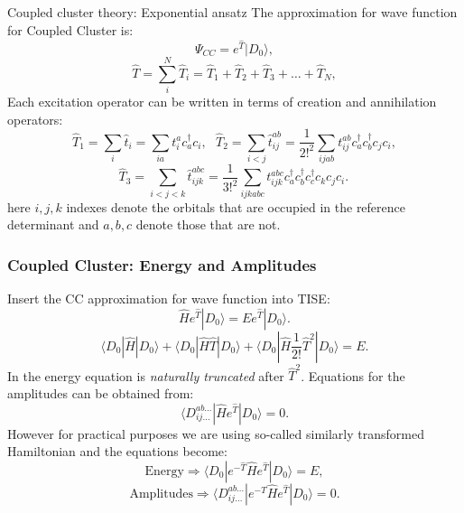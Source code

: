 \documentclass{beamer}
\begin{document}
  \begin{frame}{Coupled cluster theory: Exponential ansatz}
	The approximation for wave function for Coupled Cluster is:
	\begin{equation*}
	\Psi_{CC} =  e^{\hat{T}}|D_0\rangle,
	\end{equation*}
	\begin{equation*}
	\hat{T} = \sum_i^{N} \hat{T}_i  = \hat{T}_1 + \hat{T}_2 +\hat{T}_3 + \dots + \hat{T}_N,
	\end{equation*}
	Each excitation operator can be written in terms of creation and annihilation operators:
	\[ 
	\hat{T}_1 = \sum_{i}\hat{t}_i = \sum_{ia}t_{i}^{a} c^\dag_{a}  c_{i}, \text{    } 
	\hat{T}_2 = \sum_{i<j}\hat{t}_{ij}^{ab} = \frac{1}{2!^2}\sum_{ijab}t_{ij}^{ab} c^\dag_{a} c^\dag_{b} c_{j} c_{i}, 
	\]
	\[ 
	\hat{T}_3 = \sum_{i<j<k}\hat{t}_{ijk}^{abc} = \frac{1}{3!^2}\sum_{ijkabc}t_{ijk}^{abc} c^\dag_{a} c^\dag_{b} c^\dag_{c} c_{k}c_{j} c_{i}.
	\,
	\]
	here $i,j,k$ indexes denote the orbitals that are occupied in the reference determinant and $a,b,c$ denote those that are not.
	
\end{frame}




\begin{frame}
\frametitle{Coupled Cluster: Energy and Amplitudes}
Insert the CC approximation for wave function into TISE:
\begin{equation*}
\hat{H}e^{\hat{T}}|D_0\rangle =Ee^{\hat{T}}|D_0\rangle.
\end{equation*}
\begin{equation*}
\langle D_0|\hat{H}|D_0\rangle +  \langle D_0|\hat{H}\hat{T}|D_0\rangle +\langle D_0|\hat{H}\frac{1}{2!}\hat{T}^2|D_0\rangle  = E.
\end{equation*}
In the energy equation is \textit{naturally truncated} after $\hat{T}^2$.
Equations for the amplitudes can be obtained from:
\begin{equation*}
 \langle D_{ij\dots}^{ab\dots}|\hat{H}e^{\hat{T}}|D_0 \rangle = 0.
\end{equation*}
However for practical purposes we are using so-called similarly transformed Hamiltonian and the equations become:
\begin{equation*}
\text{Energy} \Longrightarrow \langle D_0|e^{-\hat{T}}\hat{H}e^{\hat{T}}|D_0\rangle = E,
\end{equation*}
\begin{equation*}
\text{Amplitudes} \Longrightarrow \langle D_{ij\dots}^{ab\dots}|e^{-\hat{T}}\hat{H}e^{\hat{T}}|D_0 \rangle = 0.
\end{equation*}

\end{frame}
\end{document}
